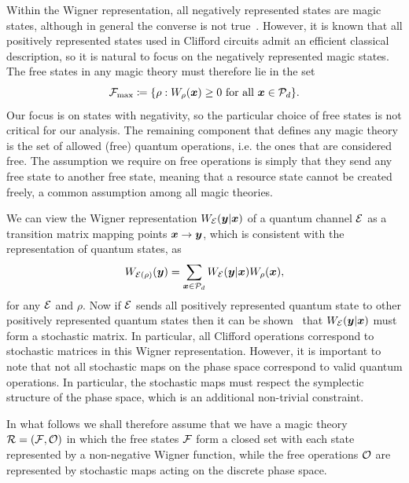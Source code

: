 \documentclass[pra,
aps,
twocolumn,
superscriptaddress,
groupedaddress,
nofootinbib,
reprint
]{revtex4-1}
\begin{document}
Within the Wigner representation, all negatively represented states are magic states, although in general the converse is not true~\cite{cit:campbell}. However, it is known that all positively represented states used in Clifford circuits admit an efficient classical description, so it is natural to focus on the negatively represented magic states. The free states in any magic theory must therefore lie in the set
\begin{equation}
    \Fmax \coloneqq \{ \rho: \W[\bmx]{\rho} \geq 0 \text{ for all } \bmx \in \cal{P}_d\}.
\end{equation}
Our focus is on states with negativity, so the particular choice of free states is not critical for our analysis. The remaining component that defines any magic theory is the set of allowed (free) quantum operations, i.e. the ones that are considered free. The assumption we require on free operations is simply that they send any free state to another free state, meaning that a resource state cannot be created freely, a common assumption among all magic theories.


We can view the Wigner representation $W_{\mathcal{E}}( \boldsymbol{y} | \boldsymbol{x})$ of a quantum channel $\mathcal{E}$ as a transition matrix mapping points $\boldsymbol{x} \rightarrow \boldsymbol{y}$, which is consistent with the representation of quantum states, as
\begin{equation}
	W_{\mathcal{E}(\rho)} (\boldsymbol{y}) = \sum_{\boldsymbol{x} \in {\mathcal P}_d} W_{\mathcal{E}}( \boldsymbol{y} | \boldsymbol{x}) W_\rho(\boldsymbol{x}),
\end{equation}
for any $\mathcal{E}$ and $\rho$. Now if $\mathcal{E}$ sends all positively represented quantum state to other positively represented quantum states then it can be shown~\cite{Wang_2019} that $W_{\mathcal{E}}(\boldsymbol{y} |\boldsymbol{x})$ must form a stochastic matrix. In particular, all Clifford operations correspond to stochastic matrices in this Wigner representation. However, it is important to note that not all stochastic maps on the phase space correspond to valid quantum operations. In particular, the stochastic maps must respect the symplectic structure of the phase space, which is an additional non-trivial constraint.

In what follows we shall therefore assume that we have a magic theory $\mathcal{R} = (\mathcal{F}, \mathcal{O})$ in which the free states $\mathcal{F}$ form a closed set with each state represented by a non-negative Wigner function, while the free operations $\mathcal{O}$ are represented by stochastic maps acting on the discrete phase space.
\end{document}
